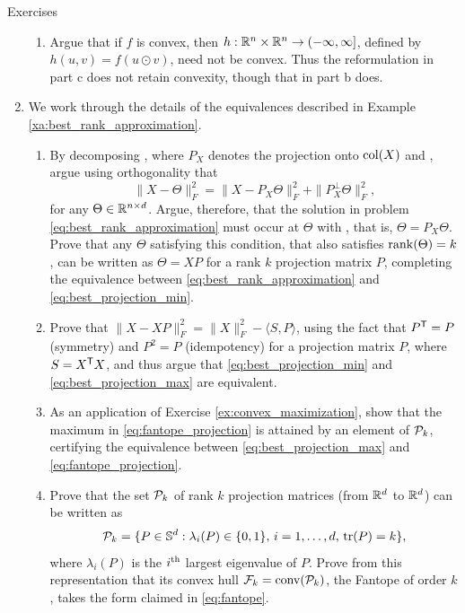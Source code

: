 \begin{xcb}{Exercises}
\begin{enumerate}[label=\thechapter.\arabic*]
\begin{enumerate}[label=\alph*.]
\item Argue that if $f$ is convex, then $h : \mathbb{R}^n \times \mathbb{R}^n \to
  (-\infty,\infty]$, defined by $h(u,v) = f(u \odot v)$, need not be
  convex. Thus the reformulation in part c does not retain convexity, though
  that in part b does. 
\end{enumerate}

\item \label{ex:best_rank_approximation}
  We work through the details of the equivalences described in Example
  \ref{xa:best_rank_approximation}.  

\begin{enumerate}[label=\alph*.]
\item By decomposing , where 
  $P_X$ denotes the projection onto $\operatorname{col}(X)$ and ,
  argue using orthogonality that 
  \[
  \|X - \Theta\|_F^2 = \|X - P_X \Theta\|_F^2 + \|P_X^\perp \Theta\|_F^2,
  \]
  for any $\Theta \in \mathbb{R}^{n \times d}$. Argue, therefore, that the solution in 
  problem \eqref{eq:best_rank_approximation} must occur at $\Theta$ with 
  , that is, $\Theta = P_X \Theta$. Prove that any
  $\Theta$ satisfying this condition, that also satisfies $\operatorname{rank}(\Theta) = k$,
  can be written as $\Theta = XP$ for a rank $k$ projection matrix $P$,
  completing the equivalence between \eqref{eq:best_rank_approximation} and  
  \eqref{eq:best_projection_min}. 

\item Prove that $\|X - XP\|_F^2 = \|X\|_F^2 - \langle S, P \rangle$, using the
  fact that $P^{\mathsf{T}} = P$ (symmetry) and $P^2 = P$ (idempotency) for a projection
  matrix $P$, where $S = X^{\mathsf{T}} X$, and thus argue that
  \eqref{eq:best_projection_min} and \eqref{eq:best_projection_max} are
  equivalent. 

\item As an application of Exercise \ref{ex:convex_maximization}, show that
  the maximum in \eqref{eq:fantope_projection} is attained by an element of 
  $\mathcal{P}_k$, certifying the equivalence between \eqref{eq:best_projection_max} and
  \eqref{eq:fantope_projection}.

\item Prove that the set $\mathcal{P}_k$ of rank $k$ projection matrices (from $\mathbb{R}^d$ to 
  $\mathbb{R}^d$) can be written as
  \[
  \mathcal{P}_k = \{ P \in \mathbb{S}^d : \lambda_i(P) \in \{0,1\}, \, i=1,\dots,d, \, \operatorname{tr}(P)
  = k\},
  \]
  where $\lambda_i(P)$ is the $i^{\textnormal{th}}$ largest eigenvalue of $P$. Prove from this 
  representation that its convex hull $\mathcal{F}_k = \operatorname{conv}(\mathcal{P}_k)$, the Fantope of
  order $k$, takes the form claimed in \eqref{eq:fantope}. 
\end{enumerate}


\end{enumerate}
\end{xcb}
